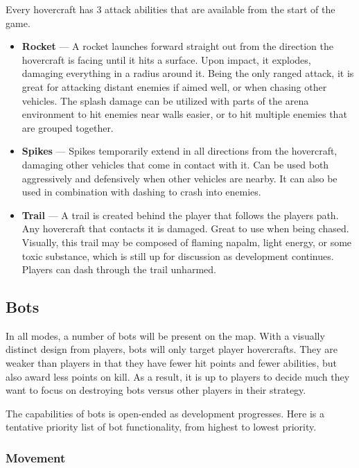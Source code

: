 \documentclass{article}
\theoremstyle{definition}
\begin{document}
Every hovercraft has 3 attack abilities that are available from the start of
the game.

\begin{itemize}
  \item \textbf{Rocket} --- A rocket launches forward straight out from the
    direction the hovercraft is facing until it hits a surface. Upon impact, it
    explodes, damaging everything in a radius around it. Being the only ranged
    attack, it is great for attacking distant enemies if aimed well, or when
    chasing other vehicles. The splash damage can be utilized with parts of the
    arena environment to hit enemies near walls easier, or to hit multiple
    enemies that are grouped together.
  \item \textbf{Spikes} --- Spikes temporarily extend in all directions from
    the hovercraft, damaging other vehicles that come in contact with it. Can
    be used both aggressively and defensively when other vehicles are nearby.
    It can also be used in combination with dashing to crash into enemies.
  \item \textbf{Trail} --- A trail is created behind the player that follows
    the players path. Any hovercraft that contacts it is damaged. Great to use
    when being chased. Visually, this trail may be composed of flaming napalm,
    light energy, or some toxic substance, which is still up for discussion as
    development continues. Players can dash through the trail unharmed.
\end{itemize}

\subsection{Bots}

In all modes, a number of bots will be present on the map. With a visually
distinct design from players, bots will only target player hovercrafts. They
are weaker than players in that they have fewer hit points and fewer abilities,
but also award less points on kill. As a result, it is up to players to decide
much they want to focus on destroying bots versus other players in their
strategy.

The capabilities of bots is open-ended as development progresses. Here is
a tentative priority list of bot functionality, from highest to lowest
priority.

\subsubsection{Movement}
\end{document}

